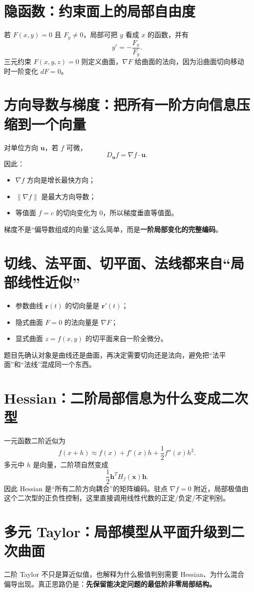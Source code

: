 \documentclass[11pt,a4paper,openany]{ctexbook}
\newcommand{\key}[1]{\textbf{\color{deep}#1}}
\begin{document}
\section{隐函数：约束面上的局部自由度}
若 $F(x,y)=0$ 且 $F_y\neq0$，局部可把 $y$ 看成 $x$ 的函数，并有
\[
y'=-\frac{F_x}{F_y}.
\]
三元约束 $F(x,y,z)=0$ 则定义曲面，$\nabla F$ 给曲面的法向，因为沿曲面切向移动时一阶变化 $dF=0$。

\section{方向导数与梯度：把所有一阶方向信息压缩到一个向量}
对单位方向 $\bm u$，若 $f$ 可微，
\[
D_{\bm u}f=\nabla f\cdot\bm u.
\]
因此：
\begin{itemize}
  \item $\nabla f$ 方向是增长最快方向；
  \item $\|\nabla f\|$ 是最大方向导数；
  \item 等值面 $f=c$ 的切向变化为 0，所以梯度垂直等值面。
\end{itemize}
梯度不是“偏导数组成的向量”这么简单，而是\key{一阶局部变化的完整编码}。

\section{切线、法平面、切平面、法线都来自“局部线性近似”}
\begin{itemize}
  \item 参数曲线 $\bm r(t)$ 的切向量是 $\bm r'(t)$；
  \item 隐式曲面 $F=0$ 的法向量是 $\nabla F$；
  \item 显式曲面 $z=f(x,y)$ 的切平面来自一阶全微分。
\end{itemize}
题目先确认对象是曲线还是曲面，再决定需要切向还是法向，避免把“法平面”和“法线”混成同一个东西。

\section{Hessian：二阶局部信息为什么变成二次型}
一元函数二阶近似为
\[
f(x+h)\approx f(x)+f'(x)h+\frac12f''(x)h^2.
\]
多元中 $h$ 是向量，二阶项自然变成
\[
\frac12\bm h^T H_f(\bm x)\bm h.
\]
因此 Hessian 是“所有二阶方向耦合”的矩阵编码。驻点 $\nabla f=0$ 附近，局部极值由这个二次型的正负性控制，这里直接调用线性代数的正定/负定/不定判别。

\section{多元 Taylor：局部模型从平面升级到二次曲面}
二阶 Taylor 不只是算近似值，也解释为什么极值判别需要 Hessian、为什么混合偏导出现。真正思路仍是：\key{先保留能决定问题的最低阶非零局部结构。}
\end{document}
